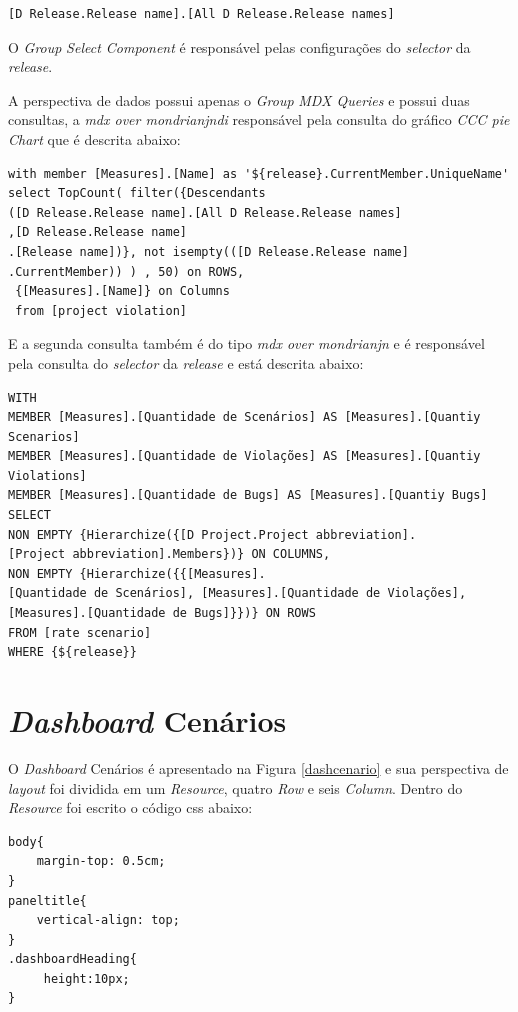 \begin{apendicesenv}
\begin{verbatim}
[D Release.Release name].[All D Release.Release names]
\end{verbatim}


O \textit{Group} \textit{Select Component} é responsável pelas configurações do \textit{selector} da \textit{release}.

A perspectiva de dados possui apenas o \textit{Group} \textit{MDX Queries} e possui duas consultas, a \textit{mdx over mondrianjndi} responsável pela consulta do gráfico \textit{CCC pie Chart} que é descrita abaixo:

\begin{verbatim}
with member [Measures].[Name] as '${release}.CurrentMember.UniqueName' 
select TopCount( filter({Descendants
([D Release.Release name].[All D Release.Release names] 
,[D Release.Release name]
.[Release name])}, not isempty(([D Release.Release name]
.CurrentMember)) ) , 50) on ROWS, 
 {[Measures].[Name]} on Columns 
 from [project violation]
\end{verbatim}

E a segunda consulta também é do tipo \textit{mdx over mondrianjn} e é responsável pela consulta do \textit{selector} da \textit{release} e está descrita abaixo:

\begin{verbatim}
WITH 
MEMBER [Measures].[Quantidade de Scenários] AS [Measures].[Quantiy Scenarios]
MEMBER [Measures].[Quantidade de Violações] AS [Measures].[Quantiy Violations]
MEMBER [Measures].[Quantidade de Bugs] AS [Measures].[Quantiy Bugs]
SELECT
NON EMPTY {Hierarchize({[D Project.Project abbreviation].
[Project abbreviation].Members})} ON COLUMNS,
NON EMPTY {Hierarchize({{[Measures].
[Quantidade de Scenários], [Measures].[Quantidade de Violações], 
[Measures].[Quantidade de Bugs]}})} ON ROWS
FROM [rate scenario]
WHERE {${release}}
\end{verbatim}



\section{\textit{Dashboard} Cenários}

O \textit{Dashboard} Cenários é apresentado na Figura \ref{dashcenario} e sua perspectiva de \textit{layout} foi dividida em um \textit{Resource}, quatro \textit{Row} e seis \textit{Column}. Dentro do \textit{Resource} foi escrito o código css abaixo:

\begin{verbatim}
body{
    margin-top: 0.5cm;
} 
paneltitle{
    vertical-align: top; 
}
.dashboardHeading{
     height:10px;
}


\end{verbatim}
\end{apendicesenv}
